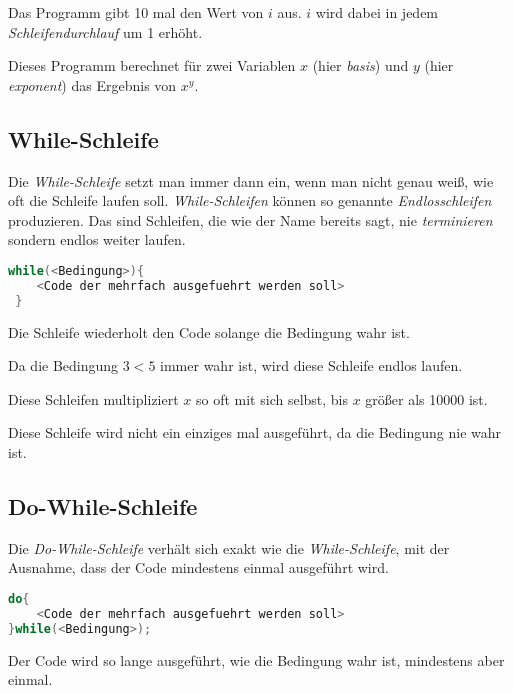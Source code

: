 \documentclass[c_worksheet.tex]{subfiles}
\begin{document}
 

Das Programm gibt 10 mal den Wert von \(i\) aus. \(i\) wird dabei in jedem \emph{Schleifendurchlauf} um 1 erhöht.

 

Dieses Programm berechnet für zwei Variablen \(x\) (hier \emph{basis}) und \(y\) (hier \emph{exponent}) das Ergebnis von \(x^y\).


\subsection{While-Schleife}

Die \emph{While-Schleife} setzt man immer dann ein, wenn man nicht genau weiß, wie oft die Schleife laufen soll. \emph{While-Schleifen} können so genannte \emph{Endlosschleifen} produzieren. Das sind Schleifen, die wie der Name bereits sagt, nie \emph{terminieren} sondern endlos weiter laufen.

\begin{lstlisting}[language=c]
 while(<Bedingung>){
 	<Code der mehrfach ausgefuehrt werden soll>
 }
 \end{lstlisting}

 Die Schleife wiederholt den Code solange die Bedingung wahr ist.

  

 Da die Bedingung \( 3 < 5 \) immer wahr ist, wird diese Schleife endlos laufen.

  

 Diese Schleifen multipliziert \(x\) so oft mit sich selbst, bis \(x\) größer als 10000 ist.

 

Diese Schleife wird nicht ein einziges mal ausgeführt, da die Bedingung nie wahr ist.



\subsection{Do-While-Schleife}

Die \emph{Do-While-Schleife} verhält sich exakt wie die \emph{While-Schleife}, mit der Ausnahme, dass der Code mindestens einmal ausgeführt wird.

\begin{lstlisting}[language=c]
do{
 	<Code der mehrfach ausgefuehrt werden soll>
}while(<Bedingung>);
\end{lstlisting} 

Der Code wird so lange ausgeführt, wie die Bedingung wahr ist, mindestens aber einmal.


\end{document}
